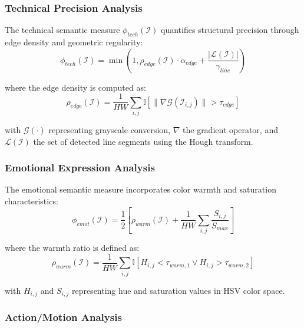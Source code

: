 \documentclass[11pt,a4paper]{article}
\begin{document}
\subsubsection{Technical Precision Analysis}

The technical semantic measure $\phi_{tech}(\mathcal{I})$ quantifies structural precision through edge density and geometric regularity:
\begin{equation}
\phi_{tech}(\mathcal{I}) = \min\left(1, \rho_{edge}(\mathcal{I}) \cdot \alpha_{edge} + \frac{|\mathcal{L}(\mathcal{I})|}{\gamma_{line}}\right)
\label{eq:technical-measure}
\end{equation}

where the edge density is computed as:
\begin{equation}
\rho_{edge}(\mathcal{I}) = \frac{1}{HW} \sum_{i,j} \mathbb{I}[\|\nabla \mathcal{G}(\mathcal{I}_{i,j})\| > \tau_{edge}]
\label{eq:edge-density}
\end{equation}

with $\mathcal{G}(\cdot)$ representing grayscale conversion, $\nabla$ the gradient operator, and $\mathcal{L}(\mathcal{I})$ the set of detected line segments using the Hough transform.

\subsubsection{Emotional Expression Analysis}

The emotional semantic measure incorporates color warmth and saturation characteristics:
\begin{equation}
\phi_{emot}(\mathcal{I}) = \frac{1}{2}\left[\rho_{warm}(\mathcal{I}) + \frac{1}{HW} \sum_{i,j} \frac{S_{i,j}}{S_{max}}\right]
\label{eq:emotional-measure}
\end{equation}

where the warmth ratio is defined as:
\begin{equation}
\rho_{warm}(\mathcal{I}) = \frac{1}{HW} \sum_{i,j} \mathbb{I}[H_{i,j} < \tau_{warm,1} \vee H_{i,j} > \tau_{warm,2}]
\label{eq:warmth-ratio}
\end{equation}

with $H_{i,j}$ and $S_{i,j}$ representing hue and saturation values in HSV color space.

\subsubsection{Action/Motion Analysis}
\end{document}
